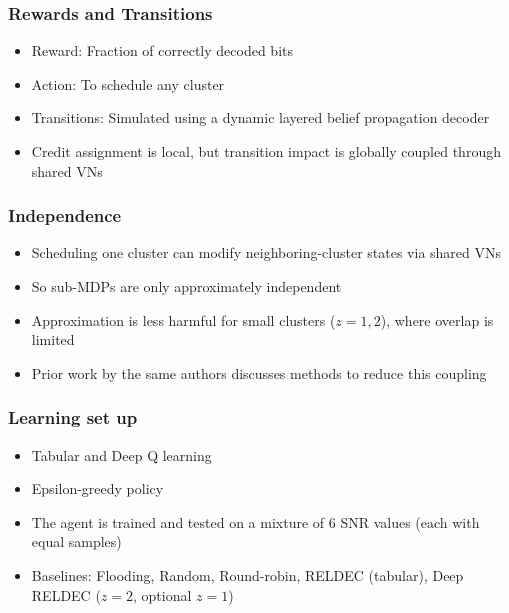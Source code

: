 \documentclass{beamer}
\begin{document}

\begin{frame}
\frametitle{Rewards and Transitions}

\begin{itemize}
    \item Reward: Fraction of correctly decoded bits
    \item Action: To schedule any cluster
    \item Transitions: Simulated using a dynamic layered belief propagation decoder
    \item Credit assignment is local, but transition impact is globally coupled through shared VNs
\end{itemize}

\end{frame}


\begin{frame}
\frametitle{Independence}

\begin{itemize}
    \item Scheduling one cluster can modify neighboring-cluster states via shared VNs
    \item So sub-MDPs are only approximately independent
    \item Approximation is less harmful for small clusters ($z=1,2$), where overlap is limited
    \item Prior work by the same authors discusses methods to reduce this coupling
\end{itemize}

\end{frame}



\begin{frame}
\frametitle{Learning set up}

\begin{itemize}
    \item Tabular and Deep Q learning
    \item Epsilon-greedy policy 
    \item The agent is trained and tested on a mixture of 6 SNR values (each with equal samples)
    \item Baselines: Flooding, Random, Round-robin, RELDEC (tabular), Deep RELDEC ($z=2$, optional $z=1$)
\end{itemize}

\end{frame}
\end{document}
